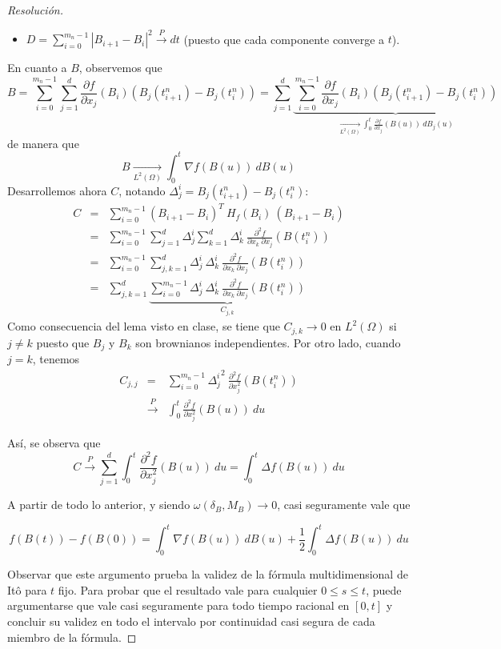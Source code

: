 \documentclass[a4paper,11pt]{article}
\newcommand{\abs}[1]{\ensuremath{\left\lvert #1 \right\rvert}}
\newcommand{\Grad}[1]{\nabla #1}
\newcommand{\Lap}[1]{\Delta #1 }
\newcommand{\Dif}[1]{d #1}
\newcommand{\IntBu}[1]{\int_0^t{#1~\Dif{B(u)}}}
\newcommand{\IntBju}[1]{\int_0^t{#1~\Dif{B_j(u)}}}
\newcommand{\Der}[2]{\frac{\partial f}{\partial x_{#1}}(#2)}
\newcommand{\DerS}[3]{\frac{\partial^2 f}{\partial x_{#1} ~\partial x_{#2}}(#3)}
\newcommand{\DerSE}[2]{\frac{\partial^2 f}{\partial x_{#1}^2}(#2)}
\begin{document}
\begin{proof}[Resoluci\'on]
\begin{itemize}
    \item $D = \displaystyle \sum_{i = 0}^{m_n - 1}{\abs{B_{i+1} - B_i}^2} \overset{P}{\longrightarrow} dt$ (puesto que cada componente
    converge a $t$).
\end{itemize}

En cuanto a $B$, observemos que 
$$B  = \sum_{i = 0}^{m_n - 1}{\sum_{j = 1}^{d}{\Der{j}{B_i} (B_j(t_{i+1}^n) - B_j(t_i^n))}} 
     = \sum_{j = 1}^{d}{\underbrace{\sum_{i = 0}^{m_n - 1}{\Der{j}{B_i} (B_j(t_{i+1}^n) - B_j(t_i^n))}}_{ \underset{L^2(\Omega)}{\longrightarrow} \IntBju{\Der{j}{B(u)}}} }$$
de manera que
$$B \underset{L^2(\Omega)}{\longrightarrow} \IntBu{\Grad{f(B(u))}}$$
Desarrollemos ahora $C$, notando $\Delta_j^i = B_j(t_{i+1}^n) - B_j(t_i^n)$:
\begin{eqnarray*}
    C &=& \sum_{i = 0}^{m_n - 1}{(B_{i+1} - B_i)^T ~ H_f(B_i) ~ (B_{i+1} - B_i)} \\
    &=& \sum_{i = 0}^{m_n - 1}{ \sum_{j=1}^{d}{\Delta_j^i \sum_{k=1}^{d}{ \Delta_k^i ~\DerS{k}{j}{B(t_i^n)}} }  } \\
    &=& \sum_{i = 0}^{m_n - 1}{\sum_{j,k=1}^{d}{\Delta_j^i ~ \Delta_k^i ~\DerS{k}{j}{B(t_i^n)}}} \\
    &=& \sum_{j,k=1}^{d}{\underbrace {\sum_{i = 0}^{m_n - 1}{\Delta_j^i ~ \Delta_k^i ~\DerS{k}{j}{B(t_i^n)}}}_{C_{j,k}}}
\end{eqnarray*}
Como consecuencia del lema visto en clase, se tiene que $C_{j,k} \to 0$ en $L^2(\Omega)$ si $j \neq k$ puesto que 
$B_j$ y $B_k$ son brownianos independientes. Por otro lado, cuando $j = k$, tenemos
\begin{eqnarray*}
    C_{j,j} &=& \sum_{i = 0}^{m_n - 1}{{\Delta_j^i}^2 ~\DerSE{j}{B(t_i^n)}} \\
    &\overset{P}{\longrightarrow}& \int_0^t{\DerSE{j}{B(u)} ~du}
\end{eqnarray*}

Así, se observa que
$$C \overset{P}{\longrightarrow} \sum_{j=1}^{d}{\int_0^t{\DerSE{j}{B(u)} ~du}} = \int_0^t{\Lap{f(B(u))} ~\Dif{u}}$$

A partir de todo lo anterior, y siendo $\omega(\delta_B, M_B) \to 0$, casi seguramente
vale que

$$f(B(t)) - f(B(0)) = \int_0^t{\Grad{f(B(u))} ~\Dif{B(u)}} + \frac{1}{2} \int_0^t{\Lap{f(B(u))} ~\Dif{u}}$$

Observar que este argumento prueba la validez de la fórmula multidimensional de Itô para $t$ fijo. Para probar que el resultado
vale para cualquier $0 \leq s \leq t$, puede argumentarse que vale casi seguramente para todo tiempo racional en $[0,t]$ y 
concluir su validez en todo el intervalo por continuidad casi segura de cada miembro de la fórmula.
\end{proof}
\end{document}
